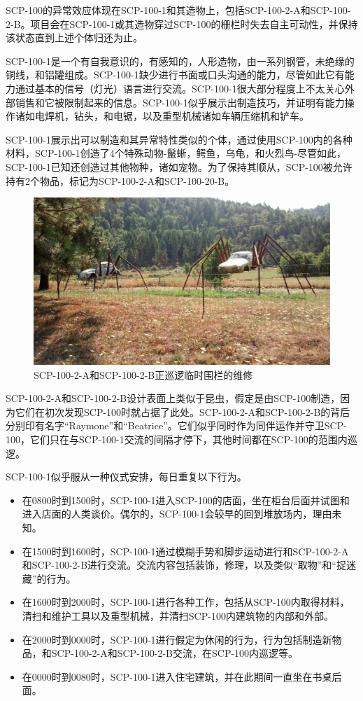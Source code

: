 SCP-100的异常效应体现在SCP-100-1和其造物上，包括SCP-100-2-A和SCP-100-2-B。项目会在SCP-100-1或其造物穿过SCP-100的栅栏时失去自主可动性，并保持该状态直到上述个体归还为止。

SCP-100-1是一个有自我意识的，有感知的，人形造物，由一系列钢管，未绝缘的铜线，和铝罐组成。SCP-100-1缺少进行书面或口头沟通的能力，尽管如此它有能力通过基本的信号（灯光）语言进行交流。SCP-100-1很大部分程度上不太关心外部销售和它被限制起来的信息。SCP-100-1似乎展示出制造技巧，并证明有能力操作诸如电焊机，钻头，和电锯，以及重型机械诸如车辆压缩机和铲车。

SCP-100-1展示出可以制造和其异常特性类似的个体，通过使用SCP-100内的各种材料，SCP-100-1创造了4个特殊动物-鬣蜥，鳄鱼，乌龟，和火烈鸟-尽管如此，SCP-100-1已知还创造过其他物种，诸如宠物。为了保持其顺从，SCP-100被允许持有2个物品，标记为SCP-100-2-A和SCP-100-20-B。

\begin{figure}[H]
    \centering
    \includegraphics[width=0.5\linewidth]{images/SCP.100.2.jpg}
    \caption*{SCP-100-2-A和SCP-100-2-B正巡逻临时围栏的维修}
\end{figure}

SCP-100-2-A和SCP-100-2-B设计表面上类似于昆虫，假定是由SCP-100制造，因为它们在初次发现SCP-100时就占据了此处。SCP-100-2-A和SCP-100-2-B的背后分别印有名字“Raymone”和“Beatrice”。它们似乎同时作为同伴运作并守卫SCP-100，它们只在与SCP-100-1交流的间隔才停下，其他时间都在SCP-100的范围内巡逻。

SCP-100-1似乎服从一种仪式安排，每日重复以下行为。

\begin{itemize}
\item 在0800时到1500时，SCP-100-1进入SCP-100的店面，坐在柜台后面并试图和进入店面的人类谈价。偶尔的，SCP-100-1会较早的回到堆放场内，理由未知。
\item 在1500时到1600时，SCP-100-1通过模糊手势和脚步运动进行和SCP-100-2-A和SCP-100-2-B进行交流。交流内容包括装饰，修理，以及类似“取物”和“捉迷藏”的行为。
\item 在1600时到2000时，SCP-100-1进行各种工作，包括从SCP-100内取得材料，清扫和维护工具以及重型机械，并清扫SCP-100内建筑物的内部和外部。
\item 在2000时到0000时，SCP-100-1进行假定为休闲的行为，行为包括制造新物品，和SCP-100-2-A和SCP-100-2-B交流，在SCP-100内巡逻等。
\item 在0000时到0080时，SCP-100-1进入住宅建筑，并在此期间一直坐在书桌后面。
\end{itemize}

